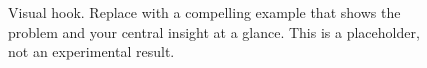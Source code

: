 \begin{figure}[!t]
  \centering
  \caption{Visual hook. Replace with a compelling example that shows
  the problem and your central insight at a glance. This is a placeholder,
  not an experimental result.}
  \label{fig:hook}
\end{figure}
